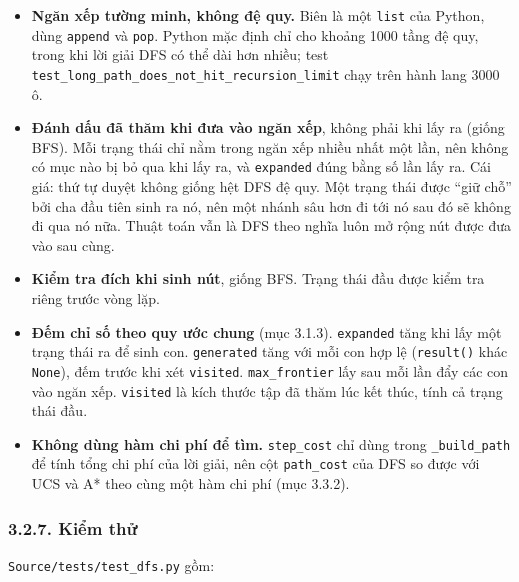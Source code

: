 \begin{itemize}
\tightlist
\item
  \textbf{Ngăn xếp tường minh, không đệ quy.} Biên là một \texttt{list} của Python, dùng \texttt{append} và \texttt{pop}. Python mặc định chỉ cho khoảng 1000 tầng đệ quy, trong khi lời giải DFS có thể dài hơn nhiều; test \texttt{test\_\allowbreak{}long\_\allowbreak{}path\_\allowbreak{}does\_\allowbreak{}not\_\allowbreak{}hit\_\allowbreak{}recursion\_\allowbreak{}limit} chạy trên hành lang 3000 ô.
\item
  \textbf{Đánh dấu đã thăm khi đưa vào ngăn xếp}, không phải khi lấy ra (giống BFS). Mỗi trạng thái chỉ nằm trong ngăn xếp nhiều nhất một lần, nên không có mục nào bị bỏ qua khi lấy ra, và \texttt{expanded} đúng bằng số lần lấy ra. Cái giá: thứ tự duyệt không giống hệt DFS đệ quy. Một trạng thái được ``giữ chỗ'' bởi cha đầu tiên sinh ra nó, nên một nhánh sâu hơn đi tới nó sau đó sẽ không đi qua nó nữa. Thuật toán vẫn là DFS theo nghĩa luôn mở rộng nút được đưa vào sau cùng.
\item
  \textbf{Kiểm tra đích khi sinh nút}, giống BFS. Trạng thái đầu được kiểm tra riêng trước vòng lặp.
\item
  \textbf{Đếm chỉ số theo quy ước chung} (mục 3.1.3). \texttt{expanded} tăng khi lấy một trạng thái ra để sinh con. \texttt{generated} tăng với mỗi con hợp lệ (\texttt{result()} khác \texttt{None}), đếm trước khi xét \texttt{visited}. \texttt{max\_\allowbreak{}frontier} lấy sau mỗi lần đẩy các con vào ngăn xếp. \texttt{visited} là kích thước tập đã thăm lúc kết thúc, tính cả trạng thái đầu.
\item
  \textbf{Không dùng hàm chi phí để tìm.} \texttt{step\_\allowbreak{}cost} chỉ dùng trong \texttt{\_\allowbreak{}build\_\allowbreak{}path} để tính tổng chi phí của lời giải, nên cột \texttt{path\_\allowbreak{}cost} của DFS so được với UCS và A* theo cùng một hàm chi phí (mục 3.3.2).
\end{itemize}

\subsubsection{3.2.7. Kiểm thử}

\texttt{Source/\allowbreak{}tests/\allowbreak{}test\_\allowbreak{}dfs.\allowbreak{}py} gồm:

